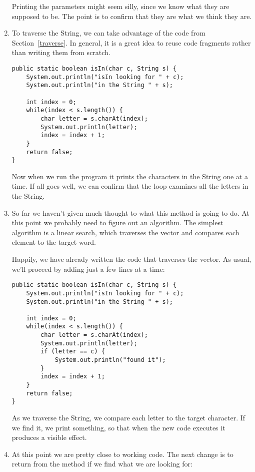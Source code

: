 \documentclass{book}
\begin{document}
\begin{enumerate}
Printing the parameters might seem silly, since we know what they
are supposed to be.  The point is to confirm that they are what we
think they are.


\item To traverse the String, we can take advantage of the code
from Section~\ref{traverse}.  In general, it is a great idea to
reuse code fragments rather than writing them from scratch.

\begin{verbatim}
public static boolean isIn(char c, String s) {
    System.out.println("isIn looking for " + c);
    System.out.println("in the String " + s);

    int index = 0;
    while(index < s.length()) {
        char letter = s.charAt(index);
        System.out.println(letter);
        index = index + 1;
    }
    return false;
}
\end{verbatim}

Now when we run the program it prints the characters in
the String one at a time.  
If all goes well, we can confirm that
the loop examines all the letters in the String.


\item So far we haven't given much thought to what this method
is going to do.  At this point we probably need to figure out an
algorithm.  The simplest algorithm is a linear search, which
traverses the vector and compares each element to the target word.

Happily, we have already written the code that traverses the
vector.  As usual, we'll proceed by adding just a few lines
at a time:

\begin{verbatim}
public static boolean isIn(char c, String s) {
    System.out.println("isIn looking for " + c);
    System.out.println("in the String " + s);

    int index = 0;
    while(index < s.length()) {
        char letter = s.charAt(index);
        System.out.println(letter);
        if (letter == c) {
            System.out.println("found it");
        }
        index = index + 1;
    }
    return false;
}
\end{verbatim}

As we traverse the String, we compare each letter to the target
character.  If we find it, we print something, so
that when the new code executes it produces a visible effect.

\item At this point we are pretty close to working code.  The
next change is to return from the method if we find what we are
looking for:


\end{enumerate}
\end{document}
